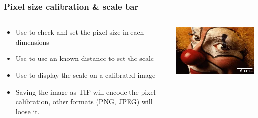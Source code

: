 \documentclass[ignorenonframetext,aspectratio=169,10pt,xcolor=table]{beamer}
\begin{document}
\begin{frame} \frametitle{Pixel size calibration \& scale bar}

  \begin{columns}

    \begin{column}{0.5\textwidth}
      \begin{itemize} \setlength\itemsep{1em}
      \item Use  to check and set the
        pixel size in each dimensions
      \item Use  to use an known distance
        to set the scale
      \item Use  to display the scale on
        a calibrated image
      \item Saving the image as TIF will encode the pixel calibration, other
      formats (PNG, JPEG) will loose it.
      \end{itemize}
    \end{column}

    \begin{column}{0.5\textwidth}
      \includegraphics[width=\textwidth]{clown-scale}
    \end{column}

  \end{columns}

\end{frame}
\end{document}
